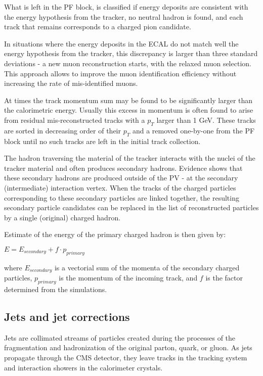 What is left in the PF block, is classified if energy deposits are consistent with the energy hypothesis from the tracker, no neutral hadron is found, and each track that remains corresponds to a charged pion candidate. 

In situations where the energy deposits in the ECAL do not match well the energy hypothesis from the tracker, this discrepancy is larger than three standard deviations - a new muon reconstruction starts, with the relaxed muon selection. This approach allows to improve the muon identification efficiency without increasing the rate of mis-identified muons. 

At times the track momentum sum may be found to be significantly larger than the calorimetric energy. Usually this excess in momentum is often found to arise from residual mis-reconstructed tracks with a $p_T$ larger than 1 GeV. These tracks are sorted in decreasing order of their $p_T$ and a removed one-by-one from the PF block until no such tracks are left in the initial track collection.

The hadron traversing the material of the tracker interacts with the nuclei of the tracker material and often produces secondary hadrons. Evidence shows that these secondary hadrons are produced outside of the PV - at the secondary (intermediate) interaction vertex. When the tracks of the charged particles corresponding to these secondary particles are linked together, the resulting secondary particle candidates can be  replaced in the list of reconstructed particles by a single (original) charged hadron.  

Estimate of the energy of the primary charged hadron is then given by:

$E = E_{secondary} + f \cdot p_{primary}$

\noindent where $E_{secondary}$ is a vectorial sum of the momenta of the secondary charged particles, $p_{primary}$ is the momentum of the incoming track, and $f$ is the factor determined from the simulations. 

\subsection{Jets and jet corrections}\label{sec:jets}

Jets are collimated streams of particles created during the processes of the fragmentation and hadronization of the original parton, quark, or gluon. As jets propagate through the CMS detector, they leave tracks in the tracking system and interaction showers in the calorimeter crystals. 

